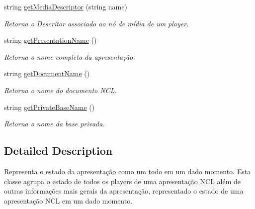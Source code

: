\begin{DoxyCompactItemize}
string \hyperlink{classbr_1_1ufscar_1_1lince_1_1ginga_1_1wac_1_1state_1_1PresentationState_a676f5c8a7880fe134f516ddbb4e94750}{getMediaDescriptor} (string name)
\begin{DoxyCompactList}\small\item\em Retorna o Descritor associado ao nó de mídia de um player. \item\end{DoxyCompactList}\item 
string \hyperlink{classbr_1_1ufscar_1_1lince_1_1ginga_1_1wac_1_1state_1_1PresentationState_a287ab3031a3c0d2cf3fe065db40753cd}{getPresentationName} ()
\begin{DoxyCompactList}\small\item\em Retorna o nome completo da apresentação. \item\end{DoxyCompactList}\item 
string \hyperlink{classbr_1_1ufscar_1_1lince_1_1ginga_1_1wac_1_1state_1_1PresentationState_a2b47b9354872ae240b80f15ec346aee7}{getDocumentName} ()
\begin{DoxyCompactList}\small\item\em Retorna o nome do documento NCL. \item\end{DoxyCompactList}\item 
string \hyperlink{classbr_1_1ufscar_1_1lince_1_1ginga_1_1wac_1_1state_1_1PresentationState_ad1a6ffea4ce3b37974c58d3aeeb10eed}{getPrivateBaseName} ()
\begin{DoxyCompactList}\small\item\em Retorna o nome da base privada. \item\end{DoxyCompactList}\end{DoxyCompactItemize}


\subsection{Detailed Description}
Representa o estado da apresentação como um todo em um dado momento. Esta classe agrupa o estado de todos os players de uma apresentação NCL além de outras informações mais gerais da apresentação, representado o estado de uma apresentação NCL em um dado momento. 


